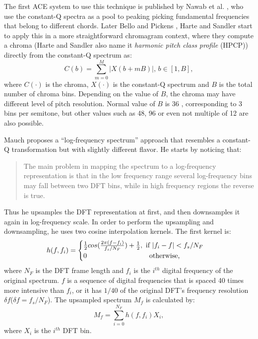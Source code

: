 The first ACE system to use this technique is published by Nawab et al. \cite{nawab2001identification}, who use the constant-Q spectra as a pool to peaking picking fundamental frequencies that belong to different chords. Later Bello and Pickens \cite{bello2005robust}, Harte and Sandler \cite{harte2005automatic} start to apply this in a more straightforward chromagram context, where they compute a chroma (Harte and Sandler also name it {\it harmonic pitch class profile} (HPCP)) directly from the constant-Q spectrum as:
\begin{equation}\label{eq:cqt-chroma}
C(b) = \sum_{m=0}^M |X(b+mB)| ,\, b \in [1,B],
\end{equation}
where $C(\cdot)$ is the chroma, $X(\cdot)$ is the constant-Q spectrum and $B$ is the total number of chroma bins. Depending on the value of $B$, the chroma may have different level of pitch resolution. Normal value of $B$ is 36 \cite{bello2005robust,harte2005automatic,oudre2010template,reed2009minimum,weil2009automatic,humphrey2012rethinking,cho2014improved}, corresponding to 3 bins per semitone, but other values such as 48, 96 or even not multiple of 12 are also possible.

Mauch proposes a ``log-frequency spectrum'' approach \cite{mauch2010automatic} that resembles a constant-Q transformation but with slightly different flavor. He starts by noticing that:
\begin{quote}
The main problem in mapping the spectrum to a log-frequency representation is that in the low frequency range several log-frequency bins may fall between two DFT bins, while in high frequency regions the reverse is true.
\end{quote}
Thus he upsamples the DFT representation at first, and then downsamples it again in log-frequency scale. In order to perform the upsampling and downsampling, he uses two cosine interpolation kernels. The first kernel is:
\begin{equation}
h(f,f_i) = 
\begin{cases}
{1\over 2} cos ({2\pi (f-f_i) \over {f_s/N_F}}) + {1\over 2}, \text{ if } |f_i-f|<f_s/N_F\\
0 \quad\quad\quad\quad\quad\quad\quad\quad\quad\text{otherwise,}
\end{cases}
\end{equation}
where $N_F$ is the DFT frame length and $f_i$ is the $i^{th}$ digital frequency of the original spectrum. $f$ is a sequence of digital frequencies that is spaced 40 times more intensive than $f_i$, or it has $1/40$ of the original DFT's frequency resolution $\delta f$($\delta f=f_s/N_F$). The upsampled spectrum $M_f$ is calculated by:
\begin{equation}
M_f = \sum_{i=0}^{N_F} {h(f,f_i)X_i},
\end{equation}
where $X_i$ is the $i^{th}$ DFT bin.

